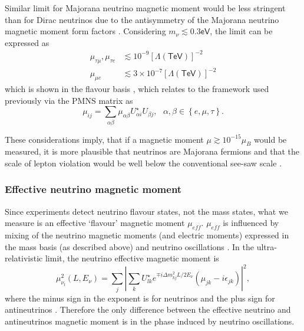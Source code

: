 Similar limit for Majorana neutrino magnetic moment would be less stringent than for Dirac neutrinos due to the antisymmetry of the Majorana neutrino magnetic moment form factors . Considering $m_{\nu}\lesssim 0.3\textsf{eV}$, the limit can be expressed as 
\begin{align}
\mu_{\tau\mu},\mu_{\tau e} &\lesssim 10^{-9}\left[\Lambda\left(\textsf{TeV}\right)\right]^{-2}\\
\mu_{\mu e} &\lesssim 3\times 10^{-7}\left[\Lambda\left(\textsf{TeV}\right)\right]^{-2}
\end{align}
which is shown in the flavour basis , which relates to the framework used previously via the \gls{PMNS} matrix as
\begin{equation}
\mu_{ij}=\sum_{\alpha\beta}\mu_{\alpha\beta}U^{\star}_{\alpha i}U_{\beta j},\ \ \ \alpha,\beta\in\left\lbrace e,\mu,\tau\right\rbrace.
\end{equation}


These considerations imply, that if a magnetic moment $\mu\gtrsim 10^{-15}\mu_B$ would be measured, it is more plausible that neutrinos are Majorana fermions and that the scale of lepton violation would be well below the conventional see-saw scale \cite{nuMMMajoranaBounds2006.pdf} .

\subsubsection{Effective neutrino magnetic moment}
Since experiments detect neutrino flavour states, not the mass states, what we measure is an effective `flavour' magnetic moment $\mu_{eff}$. $\mu_{eff}$ is influenced by mixing of the neutrino magnetic moments (and electric moments) expressed in the mass basis (as described above) and neutrino oscillations . In the ultra-relativistic limit, the neutrino effective magnetic moment is
\begin{equation}
\mu_{\nu_l}^2\left(L,E_{\nu}\right)=\sum_j\left|\sum_k U^{\star}_{lk}e^{\mp i\Delta m^2_{kj}L/2E_{\nu}}\left(\mu_{jk}-i\epsilon_{jk}\right)\right|^2,
\end{equation}
where the minus sign in the exponent is for neutrinos and the plus sign for antineutrinos \cite{nuElmagInt2015.pdf}. Therefore the only difference between the effective neutrino and antineutrinos magnetic moment is in the phase induced by neutrino oscillations.

